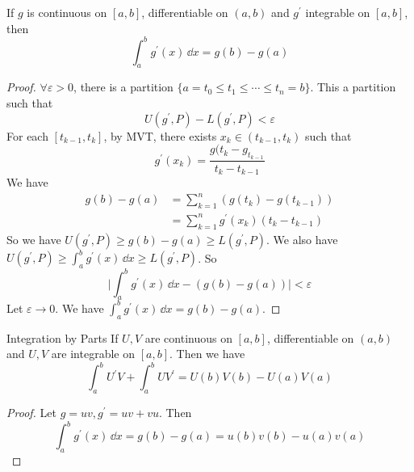 \documentclass{report}
\begin{document}
\begin{theorem}{}
    If $g$ is continuous on $[a, b]$, differentiable on $(a, b)$ and $g^{\prime}$ integrable on $[a, b]$, then 
        \begin{equation*}
            \int_{a}^{b} g^{\prime}(x) \, \dd{x}  = g(b) - g(a)
        \end{equation*}
\end{theorem}
    \begin{proof}
        $\forall \varepsilon>  0$, there is a partition $\{a = t_{0} \leq t_{ 1} \leq \cdots \leq  t_{ n} = b\}$. This a partition such that
            \begin{equation*}
                U(g^{\prime}, P) - L(g^{\prime}, P) < \varepsilon
            \end{equation*}
        For each $[t_{k - 1}, t_{k}]$, by MVT, there exists $x_{k} \in ( t_{k - 1}, t_{k})$ such that 
            \begin{equation*}
                g^{\prime}(x_{k}) = \dfrac{g(t_{k} - g_{t_{k - 1}}}{t_{k} - t_{k - 1}}
            \end{equation*}
        We have 
            \begin{align*}
                g(b) - g(a) &= \sum_{ k = 1}^{n}(g(t_{k}) - g(t_{k - 1}))\\
                            &= \sum_{k = 1}^{n}g^{\prime}(x_{k})(t_{k} - t_{k - 1})
            \end{align*}
        So we have $U(g^{\prime}, P) \geq g( b) - g(a) \geq L( g^{\prime}, P)$. We also have $U(g^{\prime}, P) \geq \int_{ a}^{b} g^{\prime}(x) \, \dd{x}  \geq L( g^{\prime}, P)$. So 
            \begin{equation*}
                \lvert \int_{a}^{b} g^{\prime}(x) \, \dd{x}  - (g(b) - g(a)) \rvert <  \varepsilon
            \end{equation*}
        Let $\varepsilon \rightarrow  0$. We have $\int_{a}^{b} g^{\prime}(x) \, \dd{x}  = g(b) - g(a)$.
    \end{proof}

\begin{theorem}{Integration by Parts}
    If $U, V$ are continuous on $[a, b]$, differentiable on $(a, b)$ and $U, V$ are integrable on $[a, b]$. Then we have
        \begin{equation*}
            \int_{a}^{b} U^{\prime}V + \int_{a}^{b} UV^{\prime} = U(b)V(b) - U(a)V(a)
        \end{equation*}
\end{theorem}
    \begin{proof}
        Let $g = uv, g^{\prime} = uv + vu$. Then 
            \begin{equation*}
                \int_{a}^{b} g^{\prime}(x) \, \dd{x}  = g(b) - g(a) = u(b)v(b) - u(a)v(a)
            \end{equation*}
    \end{proof}
\end{document}
